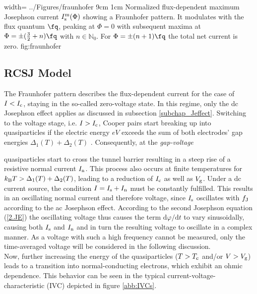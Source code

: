 {width=\textwidth}
{../Figures/fraunhofer}
{9cm}
{1cm}
{Normalized flux-dependent maximum Josephson current $I_{\rm s}^{\rm m}(\Phi)$ showing a Fraunhofer pattern. It modulates with the flux quantum $\unit{\fq}$, peaking at $\Phi=0$ with subsequent maxima at $\Phi=\pm(\frac{3}{2}+n)\unit{\fq}$ with $n\in\mathbb{N}_0$. For $\Phi=\pm(n+1)\unit{\fq}$ the total net current is zero.} 
{fig:fraunhofer}


\subsection{RCSJ Model}\label{subsec_RCSJ}

The Fraunhofer pattern describes the flux-dependent current for the case of $I<I_{\rm c}$, staying in the so-called zero-voltage state. In this regime, only the dc Josephson effect applies as discussed in subsection \ref{subchap_Jeffect}. Switching to the voltage stage, i.e. $I>I_{\rm c}$, Cooper pairs start breaking up into quasiparticles if the electric energy $eV$ exceeds the sum of both electrodes' gap energies $\Delta_1(T) + \Delta_2(T)$ \cite{Bardeen1957}. Consequently, at the \textit{gap-voltage} 


quasiparticles start to cross the tunnel barrier resulting in a steep rise of a resistive normal current $I_{\rm n}$. This process also occurs at finite temperatures for $k_{\rm B}T>\Delta_1(T) + \Delta_2(T)$, leading to a reduction of $I_{\rm c}$ as well as $V_{\rm g}$. Under a dc current source, the condition $I=I_{\rm s}+I_{\rm n}$ must be constantly fulfilled. This results in an oscillating normal current and therefore voltage, since $I_{\rm s}$ oscillates with $f_{\rm J}$ according to the ac Josephson effect. According to the second Josephson equation (\ref{2.JE}) the oscillating voltage thus causes the term $\mathrm{d}\varphi/\mathrm{d}t$ to vary sinusoidally, causing both $I_{\rm s}$ and $I_{\rm n}$ and in turn the resulting voltage to oscillate in a complex manner. As a voltage with such a high frequency cannot be measured, only the time-averaged voltage will be considered in the following discussion. \\
Now, further increasing the energy of the quasiparticles ($T>T_{\rm c}$ and/or $V>V_{\rm g}$) leads to a transition into normal-conducting electrons, which exhibit an ohmic dependence. This behavior can be seen in the typical current-voltage-characteristic (IVC) depicted in figure \ref{abb:IVCs}. \\ 

